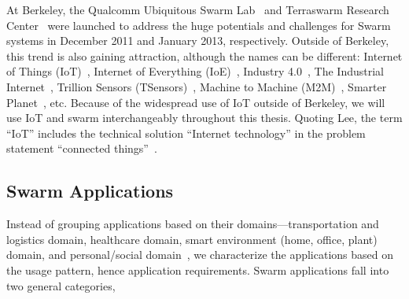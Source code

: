 At Berkeley, the Qualcomm Ubiquitous Swarm Lab~\cite{swarmlab} and Terraswarm
Research Center~\cite{terraswarm} were launched to address the huge potentials
and challenges for Swarm systems in December 2011 and January 2013,
respectively. Outside of Berkeley, this trend is also gaining attraction,
although the names can be different: Internet of Things
(IoT)~\cite{atzori2010internet}, Internet of Everything
(IoE)~\cite{bradley2013internet}, Industry 4.0~\cite{lasi2014industry}, The
Industrial Internet~\cite{eigner2018industrial}, Trillion Sensors
(TSensors)~\cite{bogue2014towards}, Machine to Machine
(M2M)~\cite{anton2014machine}, Smarter Planet~\cite{palmisano2008smarter},
etc. Because of the widespread use of IoT outside of Berkeley, we will use IoT
and swarm interchangeably throughout this thesis. Quoting Lee, the term ``IoT''
includes the technical solution ``Internet technology'' in the problem statement
``connected things''~\cite{lee2016iot}.

\subsection{Swarm Applications}
\label{sec:swarm-applications}

Instead of grouping applications based on their domains---transportation and
logistics domain, healthcare domain, smart environment (home, office, plant)
domain, and personal/social domain~\cite{atzori2010internet}, we characterize
the applications based on the usage pattern, hence application
requirements. Swarm applications fall into two general categories,


